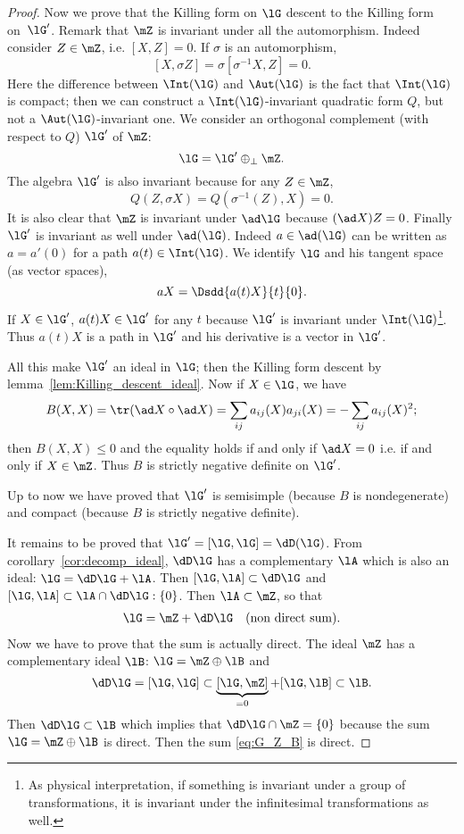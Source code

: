 \begin{proof}
	Now we prove that the Killing form on $\lG$ descent to the Killing form on~$\lG'$. Remark that $\mZ$ is invariant under all the automorphism. Indeed consider $Z\in\mZ$, i.e.  $[X,Z]=0$. If $\sigma$ is an automorphism,
	\[
		[X,\sigma Z]=\sigma[\sigma^{-1} X,Z]=0.
	\]
	Here the difference between $\Int(\lG)$ and $\Aut(\lG)$ is the fact that $\Int(\lG)$ is compact; then we can construct a $\Int(\lG)$-invariant quadratic form $Q$, but not a $\Aut(\lG)$-invariant one. We consider an orthogonal complement (with respect to $Q$) $\lG'$ of $\mZ$:
	\begin{equation}
		\lG=\lG'\oplus_{\perp}\mZ.
	\end{equation}
	The algebra $\lG'$ is also invariant because for any $Z\in\mZ$,
	\[
		Q(Z,\sigma X)=Q(\sigma^{-1}(Z),X)=0.
	\]
	It is also clear that $\mZ$ is invariant under $\ad\lG$ because $(\ad X)Z=0$. Finally $\lG'$ is invariant as well under $\ad(\lG)$. Indeed $a\in\ad(\lG)$ can be written as $a=a'(0)$ for a path $a(t)\in\Int(\lG)$. We identify $\lG$ and his tangent space (as vector spaces),
	\[
		aX=\Dsdd{ a(t)X }{t}{0}.
	\]
	If $X\in\lG'$, $a(t)X\in\lG'$ for any $t$ because $\lG'$ is invariant under $\Int(\lG)$\footnote{As physical interpretation, if something is invariant under a group of transformations, it is invariant under the infinitesimal transformations as well.}. Thus $a(t)X$ is a path in $\lG'$ and his derivative is a vector in $\lG'$.

	All this make $\lG'$ an ideal in $\lG$; then the Killing form descent by lemma~\ref{lem:Killing_descent_ideal}. Now if $X\in\lG$, we have
	\begin{equation}
		B(X,X)=\tr(\ad X\circ\ad X)
		=\sum_{ij}a_{ij}(X)a_{ji}(X)
		=-\sum_{ij}a_{ij}(X)^2;
	\end{equation}
	then $B(X,X)\leq 0$ and the equality holds if and only if $\ad X=0$ i.e. if and only if $X\in\mZ$. Thus $B$ is strictly negative definite on $\lG'$.

	Up to now we have proved that $\lG'$ is semisimple (because $B$ is nondegenerate) and compact (because $B$ is strictly negative definite).

	It remains to be proved that $\lG'=[\lG,\lG]=\dD(\lG)$. From corollary~\ref{cor:decomp_ideal}, $\dD\lG$ has a complementary $\lA$ which is also an ideal: $\lG=\dD\lG+\lA$. Then $[\lG,\lA]\subset\dD\lG$ and $[\lG,\lA]\subset\lA\cap\dD\lG:\{0\}$. Then $\lA\subset\mZ$, so that
	\begin{align}\label{eq:G_Z_B}
		\lG=\mZ+\dD\lG &  & \text{(non direct sum)}.
	\end{align}
	Now we have to prove that the sum is actually direct. The ideal $\mZ$ has a complementary ideal $\lB$: $\lG=\mZ\oplus\lB$ and
	\[
		\dD\lG=[\lG,\lG]\subset\underbrace{[\lG,\mZ]}_{=0}+[\lG,\lB]\subset\lB.
	\]
	Then $\dD\lG\subset\lB$ which implies that $\dD\lG\cap\mZ=\{0\}$ because the sum $\lG=\mZ\oplus\lB$ is direct. Then the sum \eqref{eq:G_Z_B} is direct.

\end{proof}

